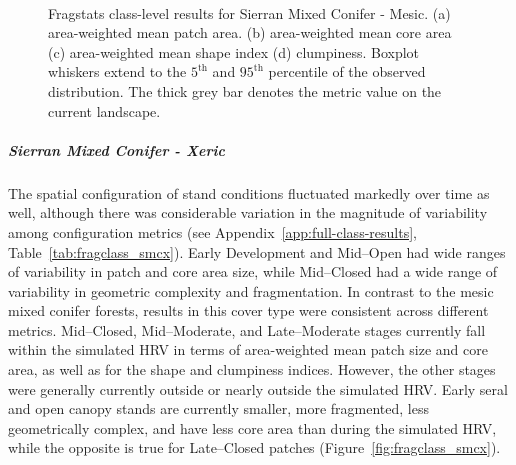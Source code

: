\begin{figure}[!htbp]
  \centering
   \\
\caption{Fragstats class-level results for Sierran Mixed Conifer - Mesic. (a) area-weighted mean patch area. (b) area-weighted mean core area (c) area-weighted mean shape index (d) clumpiness. Boxplot whiskers extend to the $5^{\text{th}}$ and $95^{\text{th}}$ percentile of the observed distribution. The thick grey bar denotes the metric value on the current landscape.}
\label{fig:fragclass_smcm}
\end{figure}




\subparagraph*{Sierran Mixed Conifer - Xeric}
The spatial configuration of stand conditions fluctuated markedly over time as well, although there was considerable variation in the magnitude of variability among configuration metrics (see Appendix~\ref{app:full-class-results}, Table~\ref{tab:fragclass_smcx}). Early Development and Mid--Open had wide ranges of variability in patch and core area size, while Mid--Closed had a wide range of variability in geometric complexity and fragmentation. In contrast to the mesic mixed conifer forests, results in this cover type were consistent across different metrics. Mid--Closed, Mid--Moderate, and Late--Moderate stages currently fall within the simulated HRV in terms of area-weighted mean patch size and core area, as well as for the shape and clumpiness indices. However, the other stages were generally currently outside or nearly outside the simulated HRV. Early seral and open canopy stands are currently smaller, more fragmented, less geometrically complex, and have less core area than during the simulated HRV, while the opposite is true for Late--Closed patches (Figure~\ref{fig:fragclass_smcx}).

